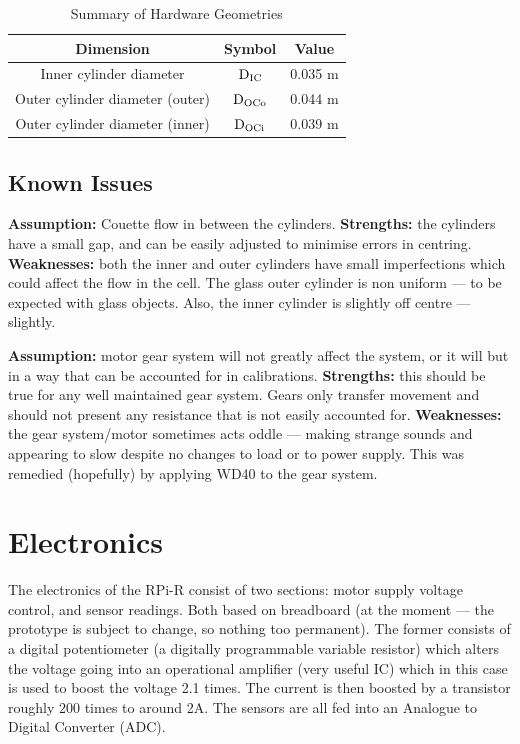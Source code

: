 \documentclass{report}
\begin{document}
			\begin{table}
				\centering
				\caption{Summary of Hardware Geometries}
				\label{tablegeoms}
				\begin{tabular}{| c | c | c |}
					\hline
					\textbf{Dimension} & \textbf{Symbol} & \textbf{Value} \\ \hline
					Inner cylinder diameter & $\rm D_{IC}$ & 0.035 m \\ \hline
					Outer cylinder diameter (outer) & $\rm D_{OCo}$ & 0.044 m \\ \hline
					Outer cylinder diameter (inner) & $\rm D_{OCi}$ & 0.039 m \\ \hline
				\end{tabular}
			\end{table}
			
			\subsection*{Known Issues}
				\textbf{Assumption:} Couette flow in between the cylinders. \textbf{Strengths:} the cylinders have a small gap, and can be easily adjusted to minimise errors in centring. \textbf{Weaknesses:} both the inner and outer cylinders have small imperfections which could affect the flow in the cell. The glass outer cylinder is non uniform --- to be expected with glass objects. Also, the inner cylinder is slightly off centre --- slightly.
				
				\textbf{Assumption:} motor gear system will not greatly affect the system, or it will but in a way that can be accounted for in calibrations. \textbf{Strengths:} this should be true for any well maintained gear system. Gears only transfer movement and should not present any resistance that is not easily accounted for. \textbf{Weaknesses:} the gear system/motor sometimes acts oddle --- making strange sounds and appearing to slow despite no changes to load or to power supply. This was remedied (hopefully) by applying WD40 to the gear system.
			
		\section{Electronics}
		
			The electronics of the RPi-R consist of two sections: motor supply voltage control, and sensor readings. Both based on breadboard (at the moment --- the prototype is subject to change, so nothing too permanent). The former consists of a digital potentiometer (a digitally programmable variable resistor) which alters the voltage going into an operational amplifier (very useful IC) which in this case is used to boost the voltage 2.1 times. The current is then boosted by a transistor roughly 200 times to around 2A. The sensors are all fed into an Analogue to Digital Converter (ADC).
			
\end{document}
